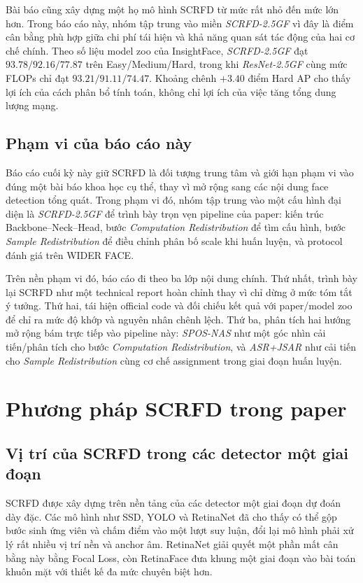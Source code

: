 Bài báo cũng xây dựng một họ mô hình SCRFD từ mức rất nhỏ đến mức lớn hơn. Trong báo cáo này, nhóm tập trung vào miền \textit{SCRFD-2.5GF} vì đây là điểm cân bằng phù hợp giữa chi phí tái hiện và khả năng quan sát tác động của hai cơ chế chính. Theo số liệu model zoo của InsightFace, \textit{SCRFD-2.5GF} đạt \(93.78/92.16/77.87\) trên Easy/Medium/Hard, trong khi \textit{ResNet-2.5GF} \cite{he2016resnet} cùng mức FLOPs chỉ đạt \(93.21/91.11/74.47\). Khoảng chênh \(+3.40\) điểm Hard AP cho thấy lợi ích của cách phân bổ tính toán, không chỉ lợi ích của việc tăng tổng dung lượng mạng. \cite{insightface2026}

\section{Phạm vi của báo cáo này}

Báo cáo cuối kỳ này giữ SCRFD là đối tượng trung tâm và giới hạn phạm vi vào đúng một bài báo khoa học cụ thể, thay vì mở rộng sang các nội dung face detection tổng quát. Trong phạm vi đó, nhóm tập trung vào một cấu hình đại diện là \textit{SCRFD-2.5GF} để trình bày trọn vẹn pipeline của paper: kiến trúc Backbone--Neck--Head, bước \textit{Computation Redistribution} để tìm cấu hình, bước \textit{Sample Redistribution} để điều chỉnh phân bố scale khi huấn luyện, và protocol đánh giá trên WIDER FACE.

Trên nền phạm vi đó, báo cáo đi theo ba lớp nội dung chính. Thứ nhất, trình bày lại SCRFD như một technical report hoàn chỉnh thay vì chỉ dừng ở mức tóm tắt ý tưởng. Thứ hai, tái hiện official code và đối chiếu kết quả với paper/model zoo để chỉ ra mức độ khớp và nguyên nhân chênh lệch. Thứ ba, phân tích hai hướng mở rộng bám trực tiếp vào pipeline này: \textit{SPOS-NAS} như một góc nhìn cải tiến/phân tích cho bước \textit{Computation Redistribution}, và \textit{ASR+JSAR} như cải tiến cho \textit{Sample Redistribution} cùng cơ chế assignment trong giai đoạn huấn luyện.

\chapter{Phương pháp SCRFD trong paper}

\section{Vị trí của SCRFD trong các detector một giai đoạn}

SCRFD được xây dựng trên nền tảng của các detector một giai đoạn dự đoán dày đặc. Các mô hình như SSD, YOLO và RetinaNet đã cho thấy có thể gộp bước sinh ứng viên và chấm điểm vào một lượt suy luận, đổi lại mô hình phải xử lý rất nhiều vị trí nền và anchor âm. RetinaNet giải quyết một phần mất cân bằng này bằng Focal Loss, còn RetinaFace đưa khung một giai đoạn vào bài toán khuôn mặt với thiết kế đa mức chuyên biệt hơn. \cite{redmon2016yolo,liu2016ssd,lin2017focal,deng2020retinaface}

